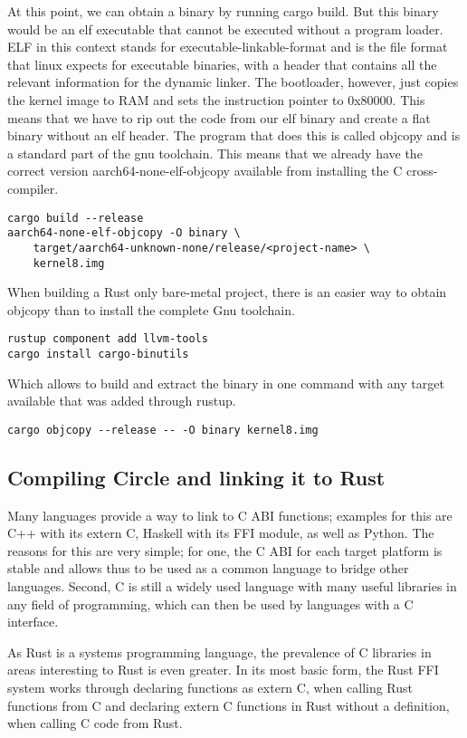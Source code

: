 At this point, we can obtain a binary by running cargo build.
But this binary would be an elf executable that cannot be executed without a program loader.
ELF in this context stands for executable-linkable-format and is the file format that linux expects for executable binaries,
with a header that contains all the relevant information for the dynamic linker.
The bootloader, however, just copies the kernel image to RAM and sets the instruction pointer to 0x80000.
This means that we have to rip out the code from our elf binary and create a flat binary without an elf header.
The program that does this is called objcopy and is a standard part of the gnu toolchain.
This means that we already have the correct version aarch64-none-elf-objcopy available from installing the C cross-compiler.

\begin{verbatim}
cargo build --release
aarch64-none-elf-objcopy -O binary \
    target/aarch64-unknown-none/release/<project-name> \
    kernel8.img
\end{verbatim}

When building a Rust only bare-metal project, there is an easier way to obtain objcopy than to install the complete Gnu toolchain.
\begin{verbatim}
rustup component add llvm-tools
cargo install cargo-binutils
\end{verbatim}
Which allows to build and extract the binary in one command with any target available that was added through rustup.
\begin{verbatim}
cargo objcopy --release -- -O binary kernel8.img
\end{verbatim}

\subsection{Compiling Circle and linking it to Rust}
\label{sec:concept_and_implementation:bare-metal:ffi}

Many languages provide a way to link to C ABI functions; examples for this are C++ with its extern C, Haskell with its FFI module, as well as Python.
The reasons for this are very simple; for one, the C ABI for each target platform is stable and allows thus to be used as a common language to bridge other languages.
Second, C is still a widely used language with many useful libraries in any field of programming, which can then be used by languages with a C interface.

As Rust is a systems programming language, the prevalence of C libraries in areas interesting to Rust is even greater.
In its most basic form, the Rust FFI system works through declaring functions as extern C, when calling Rust functions from C
and declaring extern C functions in Rust without a definition, when calling C code from Rust.

